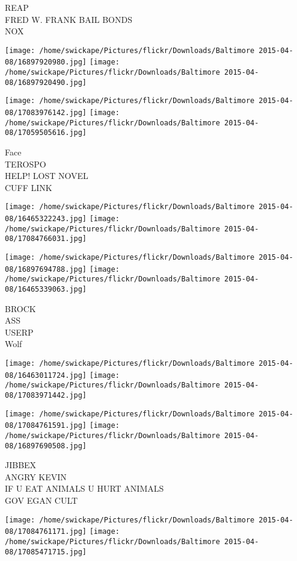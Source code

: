 \documentclass[10pt,letterpaper]{article}
\begin{document}
REAP\\
FRED W. FRANK BAIL BONDS\\
NOX\\
\pagebreak

\texttt{[image: /home/swickape/Pictures/flickr/Downloads/Baltimore 2015-04-08/16897920980.jpg]}
\texttt{[image: /home/swickape/Pictures/flickr/Downloads/Baltimore 2015-04-08/16897920490.jpg]}

\texttt{[image: /home/swickape/Pictures/flickr/Downloads/Baltimore 2015-04-08/17083976142.jpg]}
\texttt{[image: /home/swickape/Pictures/flickr/Downloads/Baltimore 2015-04-08/17059505616.jpg]}

Face\\
TEROSPO\\
HELP!  LOST NOVEL\\
CUFF LINK\\
\pagebreak

\texttt{[image: /home/swickape/Pictures/flickr/Downloads/Baltimore 2015-04-08/16465322243.jpg]}
\texttt{[image: /home/swickape/Pictures/flickr/Downloads/Baltimore 2015-04-08/17084766031.jpg]}

\texttt{[image: /home/swickape/Pictures/flickr/Downloads/Baltimore 2015-04-08/16897694788.jpg]}
\texttt{[image: /home/swickape/Pictures/flickr/Downloads/Baltimore 2015-04-08/16465339063.jpg]}

BROCK\\
ASS\\
USERP\\
Wolf\\
\pagebreak

\texttt{[image: /home/swickape/Pictures/flickr/Downloads/Baltimore 2015-04-08/16463011724.jpg]}
\texttt{[image: /home/swickape/Pictures/flickr/Downloads/Baltimore 2015-04-08/17083971442.jpg]}

\texttt{[image: /home/swickape/Pictures/flickr/Downloads/Baltimore 2015-04-08/17084761591.jpg]}
\texttt{[image: /home/swickape/Pictures/flickr/Downloads/Baltimore 2015-04-08/16897690508.jpg]}

JIBBEX\\
ANGRY KEVIN\\
IF U EAT ANIMALS U HURT ANIMALS\\
GOV EGAN CULT\\
\pagebreak

\texttt{[image: /home/swickape/Pictures/flickr/Downloads/Baltimore 2015-04-08/17084761171.jpg]}
\texttt{[image: /home/swickape/Pictures/flickr/Downloads/Baltimore 2015-04-08/17085471715.jpg]}
\end{document}
